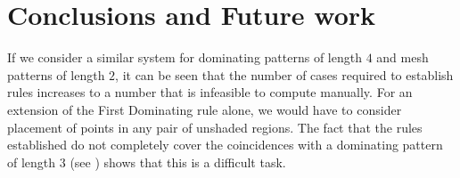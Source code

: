 \chapter{Conclusions and Future work}
\nextvar
If we consider a similar system for dominating patterns of length \(4\) and
mesh patterns of length \(2\), it can be seen that the number of cases required
to establish rules increases to a number that is infeasible to compute manually.
For an extension of the First Dominating rule alone, we would have to consider
placement of points in any pair of unshaded regions. The fact that the rules
established do not completely cover the coincidences with a dominating pattern
of length \(3\) (see ) shows that this is a difficult
task.

